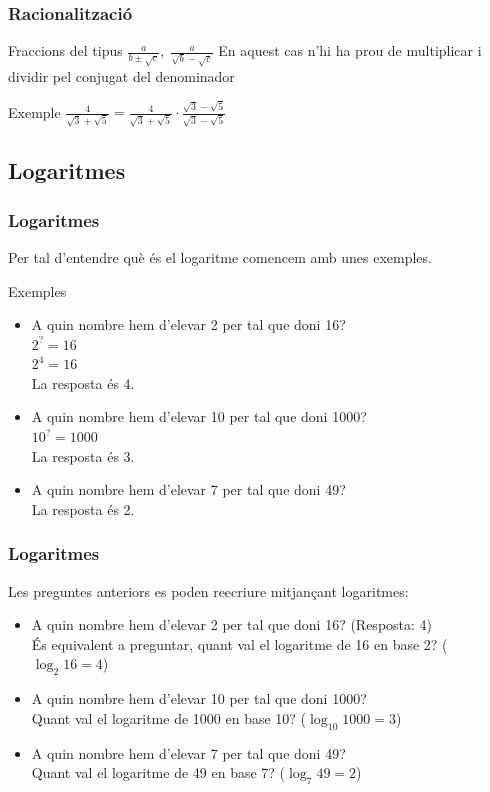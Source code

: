 \documentclass{beamer}
\begin{document}
\begin{frame}\frametitle{Racionalització}
\begin{block}{Fraccions del tipus $\frac{a}{b\pm\sqrt{c}},\; \frac{a}{\sqrt{b}-\sqrt{c}}$}
En aquest cas n'hi ha prou de multiplicar i dividir pel conjugat
del denominador
\end{block}\pause
\begin{exampleblock}{Exemple}
$\frac{4}{\sqrt{3}+\sqrt{5}}=\frac{4}{\sqrt{3}+\sqrt{5}}\cdot\frac{\sqrt{3}-\sqrt{5}}{\sqrt{3}-\sqrt{5}}$
\end{exampleblock}
\end{frame}

\subsection{Logaritmes}
\begin{frame}\frametitle{Logaritmes}
Per tal d'entendre què és el logaritme comencem amb unes
exemples.\pause
\begin{exampleblock}{Exemples}
\begin{itemize}
\item
A quin nombre hem d'elevar 2 per tal que doni 16?\\
\pause $2^{?}=16$\\ \pause
$2^{4}=16$\\
\pause La resposta és 4.\pause
\item
A quin nombre hem d'elevar 10 per tal que doni 1000?\\
\pause $10^{?}=1000$\\
\pause La resposta és 3.\pause
\item
A quin nombre hem d'elevar 7 per tal que doni 49?\\
\pause La
resposta és 2.
\end{itemize}
\end{exampleblock}
\end{frame}
\begin{frame}\frametitle{Logaritmes}
Les preguntes anteriors es poden reecriure mitjançant
logaritmes:\pause
\begin{itemize}
\item
A quin nombre hem d'elevar 2 per tal que doni 16? (Resposta:
4)\\\pause És equivalent a preguntar, quant val el logaritme de 16
en base 2? ($\log_{2}16=4$)\pause
\item
A quin nombre hem d'elevar 10 per tal que doni 1000?\\\pause Quant
val el logaritme de 1000 en base 10? ($\log_{10}1000=3$)\pause
\item
A quin nombre hem d'elevar 7 per tal que doni 49?\\\pause Quant
val el logaritme de 49 en base 7? ($\log_{7}49=2$)
\end{itemize}
\end{frame}
\end{document}
